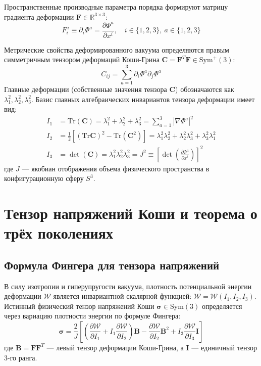 \documentclass[12pt,a4paper]{article}
\begin{document}
Пространственные производные параметра порядка формируют матрицу градиента деформации $\mathbf{F} \in \mathbb{R}^{3 \times 3}$:
\begin{equation}
	F_i^a \equiv \partial_i \Phi^a = \frac{\partial \Phi^a}{\partial x^i}, \quad i \in \{1,2,3\}, \ a \in \{1,2,3\}
\end{equation}

Метрические свойства деформированного вакуума определяются правым симметричным тензором деформаций Коши-Грина $\mathbf{C} = \mathbf{F}^T \mathbf{F} \in \mathrm{Sym}^+(3)$:
\begin{equation}
	C_{ij} = \sum_{a=1}^3 \partial_i \Phi^a \partial_j \Phi^a
\end{equation}
Главные деформации (собственные значения тензора $\mathbf{C}$) обозначаются как $\lambda_1^2, \lambda_2^2, \lambda_3^2$. Базис главных алгебраических инвариантов тензора деформации имеет вид:
\begin{align}
	I_1 &= \mathrm{Tr}(\mathbf{C}) = \lambda_1^2 + \lambda_2^2 + \lambda_3^2 = \sum_{a=1}^3 |\nabla \Phi^a|^2 \\
	I_2 &= \frac{1}{2} \left[ (\mathrm{Tr}\mathbf{C})^2 - \mathrm{Tr}(\mathbf{C}^2) \right] = \lambda_1^2 \lambda_2^2 + \lambda_2^2 \lambda_3^2 + \lambda_3^2 \lambda_1^2 \\
	I_3 &= \det(\mathbf{C}) = \lambda_1^2 \lambda_2^2 \lambda_3^2 = J^2 \equiv \left[ \det\left(\frac{\partial \Phi^a}{\partial x^i}\right) \right]^2
\end{align}
где $J$ — якобиан отображения объема физического пространства в конфигурационную сферу $S^3$.
	
	\section{Тензор напряжений Коши и теорема о трёх поколениях}
	
	\subsection{Формула Фингера для тензора напряжений}
	В силу изотропии и гиперупругости вакуума, плотность потенциальной энергии деформации $\mathcal{W}$ является инвариантной скалярной функцией: $\mathcal{W} = \mathcal{W}(I_1, I_2, I_3)$. Истинный физический тензор напряжений Коши $\boldsymbol{\sigma} \in \mathrm{Sym}(3)$ определяется через вариацию плотности энергии по формуле Фингера:
	\begin{equation}
		\boldsymbol{\sigma} = \frac{2}{J} \left[ \left( \frac{\partial \mathcal{W}}{\partial I_1} + I_1 \frac{\partial \mathcal{W}}{\partial I_2} \right) \mathbf{B} - \frac{\partial \mathcal{W}}{\partial I_2} \mathbf{B}^2 + I_3 \frac{\partial \mathcal{W}}{\partial I_3} \mathbf{I} \right]
	\end{equation}
	где $\mathbf{B} = \mathbf{F} \mathbf{F}^T$ — левый тензор деформации Коши-Грина, а $\mathbf{I}$ — единичный тензор 3-го ранга.
	
\end{document}
